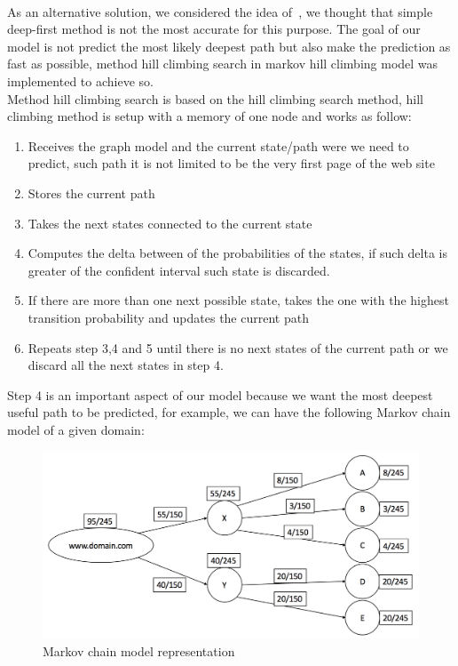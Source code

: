 \\[2ex]
As an alternative solution, we considered the idea of~\cite{article:markovmodel}, we thought that simple deep-first method is not the most accurate for this purpose. The goal of our model is not predict the most likely deepest path but also make the prediction as fast as possible, method hill climbing search in markov hill climbing model was implemented to achieve so.
\\[2ex]
Method hill climbing search is based  on the hill climbing search method, hill climbing method is setup with a memory of one node and works as follow:

\begin{enumerate}
  \item Receives the graph model and the current state/path were we need to predict, such path it is not limited to be the very first page of the web site
  \item Stores the current path
  \item Takes the next states connected to the current state
  \item Computes the delta between of the probabilities of the states, if such delta is greater of the confident interval such state is discarded.
  \item If there are more than one next possible state, takes the one with the highest transition probability and updates the current path
  \item Repeats step 3,4 and 5 until there is no next states of the current path or we discard all the next states in step 4.
\end{enumerate}

Step 4 is an important aspect of our model because we want the most deepest useful path to be predicted, for example, we can have the following Markov chain model of a given domain:

\begin{figure}[!htp]
    \centering
    \includegraphics[width=\textwidth]{markov_chain}
    \caption{Markov chain model representation}\label{fig:markov_chain}
\end{figure}

